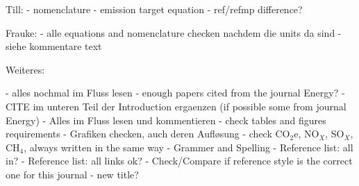 Till:
- nomenclature
- emission target equation
- ref/refmp difference?

Frauke:
- alle equations and nomenclature checken nachdem die units da sind
- siehe kommentare text

Weiteres:

- alles nochmal im Fluss lesen
- enough papers cited from the journal Energy?
- CITE im unteren Teil der Introduction ergaenzen (if possible some from journal Energy)
- Alles im Fluss lesen und kommentieren
- check tables and figures requirements
- Grafiken checken, auch deren Aufløsung
- check CO$_2$e, NO$_X$, SO$_X$, CH$_4$, always written in the same way
- Grammer and Spelling
- Reference list: all in?
- Reference list: all links ok?
- Check/Compare if reference style is the correct one for this journal
- new title?